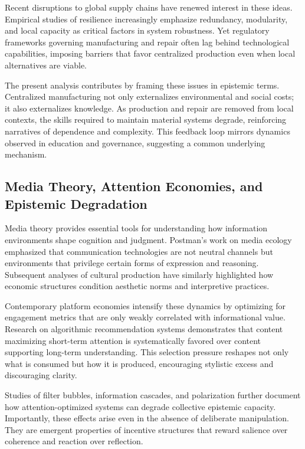 \documentclass[11pt]{article}
\begin{document}
Recent disruptions to global supply chains have renewed interest in these ideas. Empirical studies of resilience increasingly emphasize redundancy, modularity, and local capacity as critical factors in system robustness. Yet regulatory frameworks governing manufacturing and repair often lag behind technological capabilities, imposing barriers that favor centralized production even when local alternatives are viable.

The present analysis contributes by framing these issues in epistemic terms. Centralized manufacturing not only externalizes environmental and social costs; it also externalizes knowledge. As production and repair are removed from local contexts, the skills required to maintain material systems degrade, reinforcing narratives of dependence and complexity. This feedback loop mirrors dynamics observed in education and governance, suggesting a common underlying mechanism.

\subsection{Media Theory, Attention Economies, and Epistemic Degradation}

Media theory provides essential tools for understanding how information environments shape cognition and judgment. Postman’s work on media ecology emphasized that communication technologies are not neutral channels but environments that privilege certain forms of expression and reasoning. Subsequent analyses of cultural production have similarly highlighted how economic structures condition aesthetic norms and interpretive practices.

Contemporary platform economies intensify these dynamics by optimizing for engagement metrics that are only weakly correlated with informational value. Research on algorithmic recommendation systems demonstrates that content maximizing short-term attention is systematically favored over content supporting long-term understanding. This selection pressure reshapes not only what is consumed but how it is produced, encouraging stylistic excess and discouraging clarity.

Studies of filter bubbles, information cascades, and polarization further document how attention-optimized systems can degrade collective epistemic capacity. Importantly, these effects arise even in the absence of deliberate manipulation. They are emergent properties of incentive structures that reward salience over coherence and reaction over reflection.
\end{document}
